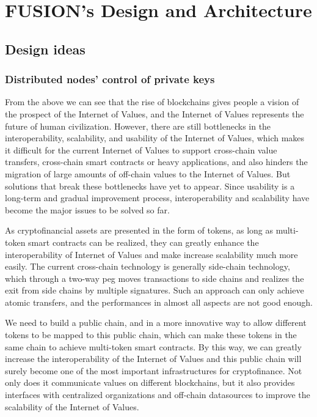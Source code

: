 \documentclass[a4paper,12pt]{article}
\begin{document}
\section{FUSION's Design and Architecture}
\subsection{Design ideas}

\subsubsection{Distributed nodes' control of  private keys}

From the above we can see that the rise of blockchains gives people a vision of the prospect of the Internet of Values, and the Internet of Values represents the future of human civilization. However, there are still bottlenecks in the interoperability, scalability, and usability of the Internet of Values, which makes it difficult for the current Internet of Values to support cross-chain value transfers, cross-chain smart contracts or heavy applications, and also hinders the migration of large amounts of off-chain values to the Internet of Values. But solutions that break these bottlenecks have yet to appear. Since usability is a long-term and gradual improvement process, interoperability and scalability have become the major issues to be solved so far.

As cryptofinancial assets are presented in the form of tokens, as long as multi-token smart contracts can be realized, they can greatly enhance the interoperability of Internet of Values and make increase scalability much more easily. The current cross-chain technology is generally side-chain technology, which through a two-way peg moves transactions to side chains and realizes the exit from side chains by multiple signatures. Such an approach can only achieve atomic transfers, and the performances in almost all aspects are not good enough.

We need to build a public chain, and in a more innovative way to allow different tokens to be mapped to this public chain, which can make these tokens in the same chain to achieve multi-token smart contracts. By this way, we can greatly increase the interoperability of the Internet of Values and this public chain will surely become one of the most important infrastructures for cryptofinance. Not only does it communicate values on different blockchains, but it also provides interfaces with centralized organizations and off-chain datasources to improve the scalability of the Internet of Values.
\end{document}
